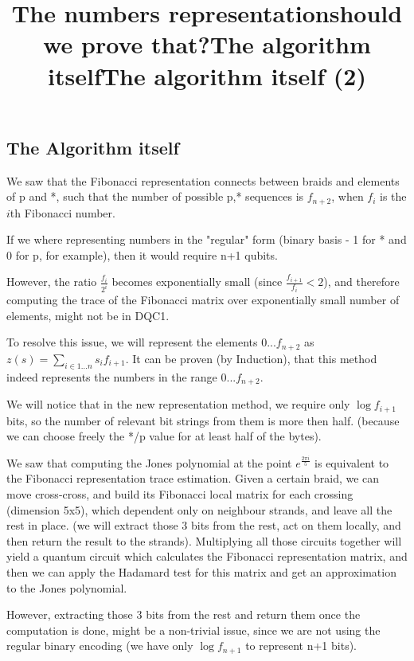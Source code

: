 \documentclass{article}
\begin{document}
\subsection{The Algorithm itself}
\title{The numbers representation}
We saw that the Fibonacci representation connects between braids and elements of p and *, such that the number of possible p,* sequences is $f_{n+2}$, when $f_{i}$ is the $i$th Fibonacci number.

If we where representing numbers in the "regular" form (binary basis - 1 for * and 0 for p, for example), then it would require n+1 qubits. 

However, the ratio $\frac{f_{i}}{2^{i}}$ becomes exponentially small (since $\frac{f_{i+1}}{f_{i}} < 2 $), and therefore computing the trace of the Fibonacci matrix over exponentially small number of elements, might not be in DQC1.

To resolve this issue, we will represent the elements {0...$f_{n+2}$} as $z(s) = \sum\limits_{i \in {1...n}}{s_{i}f_{i+1}}$.
It can be proven (by Induction), that this method indeed represents the numbers in the range {0...$f_{n+2}$}. 

\title{should we prove that?}


\title{The algorithm itself}
We will notice that in the new representation method, we require only $\log{f_{i+1}}$ bits, so the number of relevant bit strings from them is more then half. (because we can choose freely the */p value for at least half of the bytes).

We saw that computing the Jones polynomial at the point $e^{\frac{2{\pi}i}{5}}$ is equivalent to the Fibonacci representation trace estimation.
Given a certain braid, we can move cross-cross, and build its Fibonacci local matrix for each crossing (dimension 5x5), which dependent only on  neighbour strands, and leave all the rest in place. (we will extract those 3 bits from the rest, act on them locally, and then return the result to the strands). Multiplying all those circuits together will yield a quantum circuit which calculates the Fibonacci representation matrix, and then we can apply the Hadamard test for this matrix and get an approximation to the Jones polynomial.


\title{The algorithm itself (2)}
However, extracting those 3 bits from the rest and return them once the computation is done, might be a non-trivial issue, since we are not using the regular binary encoding (we have only $\log{f_{n+1}}$ to represent n+1 bits). 
\end{document}
